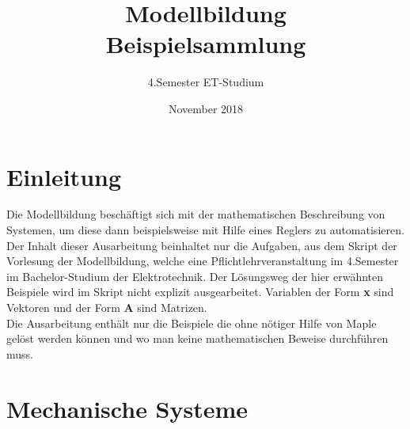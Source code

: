 \documentclass[a4paper,12p]{article}
\title{\huge Modellbildung\\\large \huge Beispielsammlung}
\author{\huge 4.Semester ET-Studium}
\date{\huge November 2018}
\begin{document}
	
\maketitle
\newpage
\tableofcontents
\newpage
\section{Einleitung}
Die Modellbildung beschäftigt sich mit der mathematischen Beschreibung von Systemen, um diese dann beispielsweise mit Hilfe eines Reglers zu automatisieren.
\newline
Der Inhalt dieser Ausarbeitung beinhaltet nur die Aufgaben, aus dem Skript der Vorlesung der Modellbildung, welche eine Pflichtlehrveranstaltung im 4.Semester im Bachelor-Studium der Elektrotechnik. Der Lösungsweg der hier erwähnten Beispiele wird im Skript nicht explizit ausgearbeitet. Variablen der Form \textbf{x} sind Vektoren und der Form \textbf{A} sind Matrizen. \\
Die Ausarbeitung enthält nur die Beispiele die ohne nötiger Hilfe von Maple gelöst werden können und wo man keine mathematischen Beweise durchführen muss.
\section{Mechanische Systeme}
\end{document}
